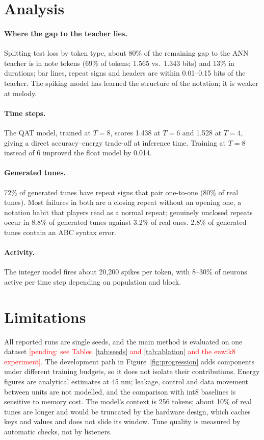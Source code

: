 \documentclass[10pt]{article}
\newcommand{\pending}[1]{\textcolor{red}{[pending: #1]}}
\begin{document}
\section{Analysis}
\label{sec:analysis}

\paragraph{Where the gap to the teacher lies.} Splitting test loss by token type, about 80\% of the remaining gap
to the ANN teacher is in note tokens (69\% of tokens; 1.565 vs.\ 1.343 bits) and 13\% in durations; bar lines,
repeat signs and headers are within 0.01--0.15 bits of the teacher. The spiking model has learned the structure of
the notation; it is weaker at melody.

\paragraph{Time steps.} The QAT model, trained at $T=8$, scores 1.438 at $T=6$ and 1.528 at $T=4$, giving a direct
accuracy--energy trade-off at inference time. Training at $T=8$ instead of 6 improved the float model by 0.014.

\paragraph{Generated tunes.} 72\% of generated tunes have repeat signs that pair one-to-one (80\% of real tunes).
Most failures in both are a closing repeat without an opening one, a notation habit that players read as a normal
repeat; genuinely unclosed repeats occur in 8.8\% of generated tunes against 3.2\% of real ones. 2.8\% of generated
tunes contain an ABC syntax error.

\paragraph{Activity.} The integer model fires about 20{,}200 spikes per token, with 8--30\% of neurons active per
time step depending on population and block.

\section{Limitations}

All reported runs are single seeds, and the main method is evaluated on one dataset \pending{see
Tables~\ref{tab:seeds} and \ref{tab:ablation} and the enwik8 experiment}. The development path in
Figure~\ref{fig:progression} adds components under different training budgets, so it does not isolate their
contributions. Energy figures are analytical estimates at 45 nm; leakage, control and data movement between units
are not modelled, and the comparison with int8 baselines is sensitive to memory cost. The model's context is 256
tokens; about 10\% of real tunes are longer and would be truncated by the hardware design, which caches keys and
values and does not slide its window. Tune quality is measured by automatic checks, not by listeners.
\end{document}
